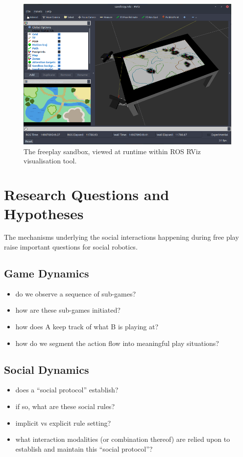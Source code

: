 \documentclass[a4paper]{article}
\begin{document}
\begin{figure}
    \centering
    \includegraphics[width=0.9\linewidth]{rviz-sandtray}
    \caption{The freeplay sandbox, viewed at runtime within ROS RViz
    visualisation tool.}
    \label{fig|rviz}
\end{figure}


\section{Research Questions and Hypotheses}

The mechanisms underlying the social interactions happening during free play
raise important questions for social robotics.


\subsection{Game Dynamics}

\begin{itemize}
    \item do we observe a sequence of sub-games?
    \item how are these sub-games initiated?
    \item how does A keep track of what B is playing at?
    \item how do we segment the action flow into meaningful play situations?
\end{itemize}

\subsection{Social Dynamics}

\begin{itemize}
    \item does a ``social protocol'' establish?
    \item if so, what are these social rules?
    \item implicit vs explicit rule setting?
    \item what interaction modalities (or combination thereof) are relied upon
        to establish and maintain this ``social protocol''?
\end{itemize}
\end{document}
